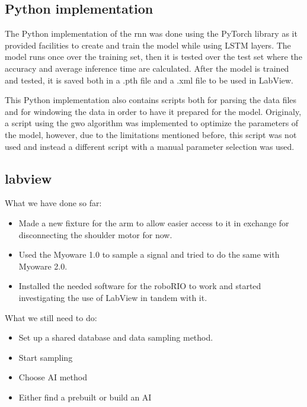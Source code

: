 \subsection{Python implementation}
The Python implementation of the \acrshort{rnn} was done using the PyTorch library as it provided facilities to create and train the model
while using LSTM layers. The model runs once over the training set, then it is tested over the test set where the accuracy and average inference
time are calculated. After the model is trained and tested, it is saved both in a .pth file and a .xml file to be used in LabView.

This Python implementation also contains scripts both for parsing the data files and for windowing the data in order to have it prepared for the model.
Originaly, a script using the \acrshort{gwo} algorithm was implemented to optimize the parameters of the model, however, due to the limitations mentioned before,
this script was not used and instead a different script with a manual parameter selection was used.

\subsection{labview}

What we have done so far: 

\begin{itemize}
    
    \item Made a new fixture for the arm to allow easier access to it in exchange for disconnecting the shoulder motor for now.
    
    \item Used the Myoware 1.0 to sample a signal and tried to do the same with Myoware 2.0.
    
    \item Installed the needed software for the roboRIO to work and started investigating the use of LabView in tandem with it.
    
\end{itemize}
What we still need to do:
\begin{itemize}    
    \item Set up a shared database and data sampling method.
    
    \item Start sampling
    
    \item Choose AI method
    
    \item Either find a prebuilt or build an AI
\end{itemize}